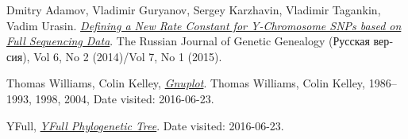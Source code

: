 \raggedright
\begin{thebibliography}{bla}

 Dmitry Adamov, Vladimir Guryanov,
Sergey Karzhavin, Vladimir Tagankin, Vadim Urasin.
\emph{\href{http://rjgg.molgen.org/index.php/RJGGRE/article/view/151}
{Defining a New Rate Constant for Y-Chromosome SNPs based on Full Sequencing Data}}.
The Russian Journal of Genetic Genealogy
(\foreignlanguage{russian}{Русская версия}),
Vol 6, No 2 (2014)/Vol 7, No 1 (2015).

 Thomas Williams, Colin Kelley,
\emph{\href{http://www.gnuplot.info/}{Gnuplot}}.
Thomas Williams, Colin Kelley, 1986--1993, 1998, 2004,
Date visited: 2016-06-23.

 YFull,
\emph{\href{http://yfull.com/tree/}{YFull Phylogenetic Tree}}.
Date visited: 2016-06-23.


\end{thebibliography}
